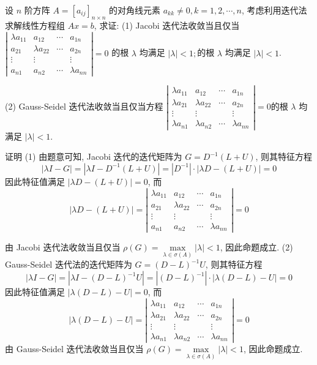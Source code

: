   \begin{tcolorbox}[enhanced,colback=10,colframe=9,breakable,coltitle=green!25!black,title=2024]


 设 $ n $ 阶方阵 $ A=\left[a_{i j}\right]_{n \times n} $ 的对角线元素 $ a_{k k} \neq 0, k=1,2, \cdots, n $, 考虑利用迭代法求解线性方程组 $ A x=b $, 求证:
(1) Jacobi 迭代法收敛当且仅当 $ \left|\begin{array}{cccc}\lambda a_{11} & a_{12} & \cdots & a_{1 n} \\ a_{21} & \lambda a_{22} & \cdots & a_{2 n} \\ \vdots & \vdots & & \vdots \\ a_{n 1} & a_{n 2} & \cdots & \lambda a_{n n}\end{array}\right|=0 $ 的根 $ \lambda $ 均满足 $ |\lambda|<1 ; $的根 $ \lambda $ 均满足 $ |\lambda|<1 $.

(2) Gauss-Seidel 迭代法收敛当且仅当方程 $ \left|\begin{array}{cccc}\lambda a_{11} & a_{12} & \cdots & a_{1 n} \\ \lambda a_{21} & \lambda a_{22} & \cdots & a_{2 n} \\ \vdots & \vdots & & \vdots \\ \lambda a_{n 1} & \lambda a_{n 2} & \cdots & \lambda a_{n n}\end{array}\right|=0 $的根 $ \lambda $ 均满足 $ |\lambda|<1 $.

 \tcblower

证明 (1) 由题意可知, Jacobi 迭代的迭代矩阵为 $ G=D^{-1}(L+U) $, 则其特征方程
$$
|\lambda I-G|=\left|\lambda I-D^{-1}(L+U)\right|=\left|D^{-1}\right| \cdot|\lambda D-(L+U)|=0
$$
因此特征值满足 $ |\lambda D-(L+U)|=0 $, 而
$$
|\lambda D-(L+U)|=\left|\begin{array}{cccc}
\lambda a_{11} & a_{12} & \cdots & a_{1 n} \\
a_{21} & \lambda a_{22} & \cdots & a_{2 n} \\
\vdots & \vdots & & \vdots \\
a_{n 1} & a_{n 2} & \cdots & \lambda a_{n n}
\end{array}\right|=0
$$

由 Jacobi 迭代法收敛当且仅当 $ \rho(G)=\max\limits _{\lambda \in \sigma(A)}|\lambda|<1 $, 因此命题成立.
(2) Gauss-Seidel 迭代法的迭代矩阵为 $ G=(D-L)^{-1} U $, 则其特征方程
$$
|\lambda I-G|=\left|\lambda I-(D-L)^{-1} U\right|=\left|(D-L)^{-1}\right| \cdot|\lambda(D-L)-U|=0
$$
因此特征值满足 $ |\lambda(D-L)-U|=0 $, 而
$$
|\lambda(D-L)-U|=\left|\begin{array}{cccc}
\lambda a_{11} & a_{12} & \cdots & a_{1 n} \\
\lambda a_{21} & \lambda a_{22} & \cdots & a_{2 n} \\
\vdots & \vdots & & \vdots \\
\lambda a_{n 1} & \lambda a_{n 2} & \cdots & \lambda a_{n n}
\end{array}\right|=0
$$
由 Gauss-Seidel 迭代法收敛当且仅当 $ \rho(G)=\max\limits _{\lambda \in \sigma(A)}|\lambda|<1 $, 因此命题成立.
 \end{tcolorbox}


